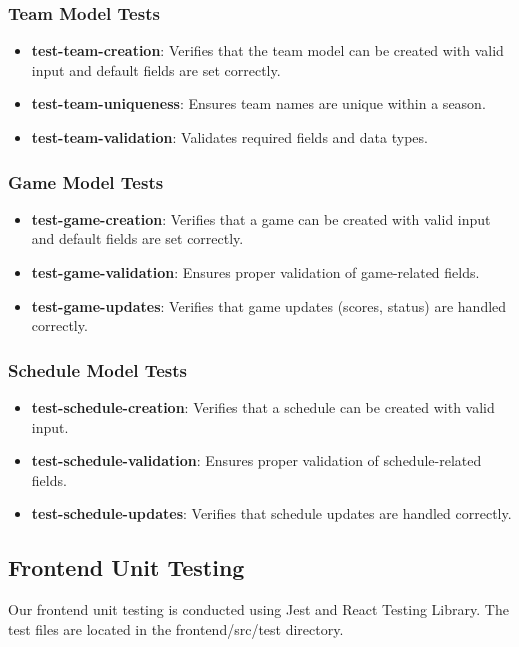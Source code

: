 \documentclass[12pt, titlepage]{article}
\begin{document}
\subsubsection{Team Model Tests}
\begin{itemize}
    \item \textbf{test-team-creation}: Verifies that the team model can be created with valid input and default fields are set correctly.
    \item \textbf{test-team-uniqueness}: Ensures team names are unique within a season.
    \item \textbf{test-team-validation}: Validates required fields and data types.
\end{itemize}

\subsubsection{Game Model Tests}
\begin{itemize}
    \item \textbf{test-game-creation}: Verifies that a game can be created with valid input and default fields are set correctly.
    \item \textbf{test-game-validation}: Ensures proper validation of game-related fields.
    \item \textbf{test-game-updates}: Verifies that game updates (scores, status) are handled correctly.
\end{itemize}

\subsubsection{Schedule Model Tests}
\begin{itemize}
    \item \textbf{test-schedule-creation}: Verifies that a schedule can be created with valid input.
    \item \textbf{test-schedule-validation}: Ensures proper validation of schedule-related fields.
    \item \textbf{test-schedule-updates}: Verifies that schedule updates are handled correctly.
\end{itemize}

\subsection{Frontend Unit Testing}

Our frontend unit testing is conducted using Jest and React Testing Library. The test files are located in the frontend/src/test directory.
\end{document}
